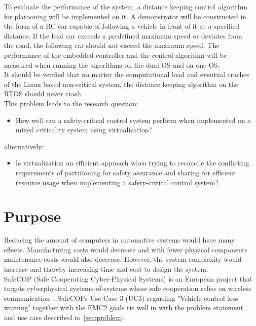 To evaluate the performance of the system, a distance keeping control algorithm for platooning will be implemented on it. A demonstrator will be constructed in the form of a RC car capable of following a vehicle in front of it at a specified distance. If the lead car exceeds a predefined maximum speed or deviates from the road, the following car should not exceed the maximum speed. The performance of the embedded controller and the control algorithm will be measured when running the algorithms on the dual-OS and on one OS.\\

It should be verified that no matter the computational load and eventual crashes of the Linux based non-critical system, the distance keeping algorithm on the RTOS should never crash.\\ %

This problem leads to the research question: 
\begin{itemize}
\item How well can a safety-critical control system perform when implemented on a mixed criticality system using virtualization?
\end{itemize}
alternatively:

\begin{itemize}
\item Is virtualization an efficient approach when trying to reconcile the conflicting requirements of partitioning for safety assurance and sharing for efficient resource usage when implementing a safety-critical control system?
\end{itemize}

\section{Purpose}
Reducing the amount of computers in automotive systems would have many effects. Manufacturing costs would decrease and with fewer physical components maintenance costs would also decrease. However, the system complexity would increase and thereby increasing time and cost to design the system. \\

SafeCOP (Safe Cooperating Cyber-Physical Systems) is an European project that targets cyberphysical systems-of-systems whose safe cooperation relies on wireless communication~\cite{safecop2016}. SafeCOPs Use Case 3 (UC3) regarding "Vehicle control loss warning" together with the EMC2 goals tie well in with the problem statement and use case described in~\ref{sec:problem}. %

